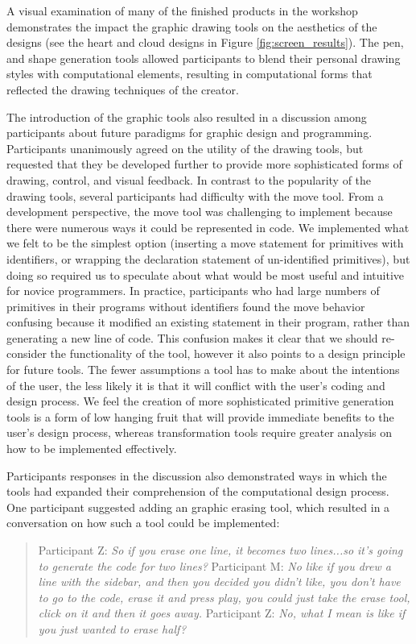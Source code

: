 \documentclass{sigchi}
\begin{document}
A visual examination of many of the finished products in the workshop demonstrates the impact the graphic drawing tools on the aesthetics of the designs (see the heart and cloud designs in Figure \ref{fig:screen_results}). The pen, and shape generation tools allowed participants to blend their personal drawing styles with computational elements, resulting in computational forms that reflected the drawing techniques of the creator. 

The introduction of the graphic tools also resulted in a discussion among participants about future paradigms for graphic design and programming. Participants unanimously agreed on the utility of the drawing tools, but requested that they be developed further to provide more sophisticated forms of drawing, control, and visual feedback. In contrast to the popularity of the drawing tools, several participants had difficulty with the move tool. From a development perspective, the move tool was challenging to implement because there were numerous ways it could be represented in code. We implemented what we felt to be the simplest option (inserting a move statement for primitives with identifiers, or wrapping the declaration statement of un-identified primitives), but doing so required us to speculate about what would be most useful and intuitive for novice programmers. In practice, participants who had large numbers of primitives in their programs without identifiers found the move behavior confusing because it modified an existing statement in their program, rather than generating a new line of code. This confusion makes it clear that we should re-consider the functionality of the tool, however it also points to a design principle for future tools. The fewer assumptions a tool has to make about the intentions of the user, the less likely it is that it will conflict with the user's coding and design process. We feel the creation of more sophisticated primitive generation tools is a form of low hanging fruit that will provide immediate benefits to the user's design process, whereas transformation tools require greater analysis on how to be implemented effectively. 

Participants responses in the discussion also demonstrated ways in which the tools had expanded their comprehension of the computational design process. One participant suggested adding an graphic erasing tool, which resulted in a conversation on how such a tool could be implemented:

\begin{quotation}
Participant Z: \textit{So if you erase one line, it becomes two lines...so it's going to generate the code for two lines?}
Participant M: \textit{No like if you drew a line with the sidebar, and then you decided you didn't like, you don't have to go to the code, erase it and press play, you could just take the erase tool, click on it and then it goes away.}
Participant Z:  \textit{No, what I mean is like if you just wanted to erase half?}
\end{quotation}
\end{document}
